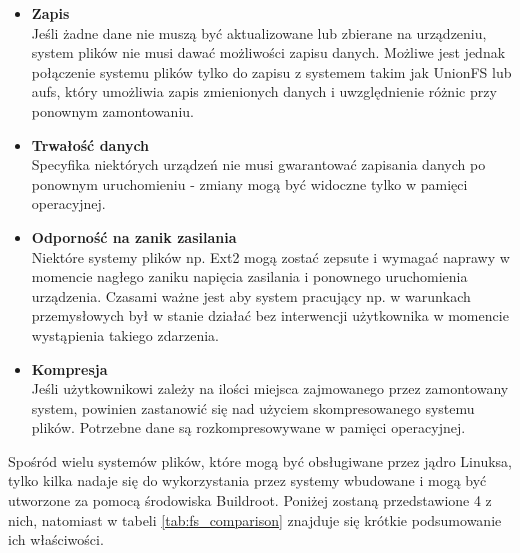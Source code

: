 \documentclass[a4paper,12pt]{book}
\begin{document}
				\begin{itemize}
					\item \textbf{Zapis}\\
						Jeśli żadne dane nie muszą być aktualizowane lub zbierane na urządzeniu, system plików nie musi dawać możliwości zapisu danych. Możliwe jest jednak połączenie systemu plików tylko do zapisu z systemem takim jak UnionFS lub aufs, który umożliwia zapis zmienionych danych i uwzględnienie różnic przy ponownym zamontowaniu.
					\item \textbf{Trwałość danych}\\
						Specyfika niektórych urządzeń nie musi gwarantować zapisania danych po ponownym uruchomieniu - zmiany mogą być widoczne  tylko w pamięci operacyjnej.
					\item \textbf{Odporność na zanik zasilania}\\
						Niektóre systemy plików np. Ext2 mogą zostać zepsute i wymagać naprawy w momencie nagłego zaniku napięcia zasilania i ponownego uruchomienia urządzenia. Czasami ważne jest aby system pracujący np. w warunkach przemysłowych był w stanie działać bez interwencji użytkownika w momencie wystąpienia takiego zdarzenia.
					\item \textbf{Kompresja}\\
						Jeśli użytkownikowi zależy na ilości miejsca zajmowanego przez zamontowany system, powinien zastanowić się nad użyciem skompresowanego systemu plików. Potrzebne dane są rozkompresowywane w pamięci operacyjnej.
				\end{itemize}
				Spośród wielu systemów plików, które mogą być obsługiwane przez jądro Linuksa, tylko kilka nadaje się do wykorzystania przez systemy wbudowane i mogą być utworzone za pomocą środowiska Buildroot. Poniżej zostaną przedstawione 4 z nich, natomiast w tabeli \ref{tab:fs_comparison} znajduje się krótkie podsumowanie ich właściwości.
				
\end{document}
